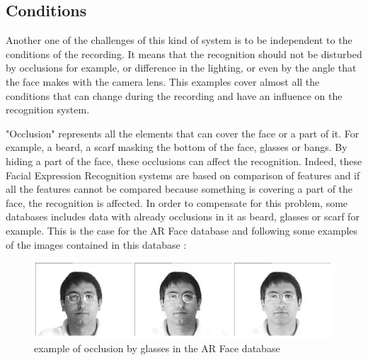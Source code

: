 \subsection{Conditions}

\vspace{\baselineskip}
\noindent Another one of the challenges of this kind of system is to be independent to the conditions of the recording. It means that the recognition should not be disturbed by occlusions for example, or difference in the lighting, or even by the angle that the face makes with the camera lens. This examples cover almost all the conditions that can change during the recording and have an influence on the recognition system. 
\newline

\noindent "Occlusion" represents all the elements that can cover the face or a part of it. For example, a beard, a scarf masking the bottom of the face, glasses or bangs. By hiding a part of the face, these occlusions can affect the recognition. Indeed, these Facial Expression Recognition systems are based on comparison of features and if all the features cannot be compared because something is covering a part of the face, the recognition is affected. In order to compensate for this problem, some databases includes data with already occlusions in it as beard, glasses or scarf for example. This is the case for the AR Face database and following some examples of the images contained in this database \cite{ARFACE}:
\newline

\vspace{\baselineskip}
\begin{figure}[!h]
\begin{center}
\noindent \includegraphics[scale=0.7]{figures/arface_example1} 
\newline
\caption{example of occlusion by glasses in the AR Face database}
\label{arface_example1}
\end{center} 
\end{figure}

